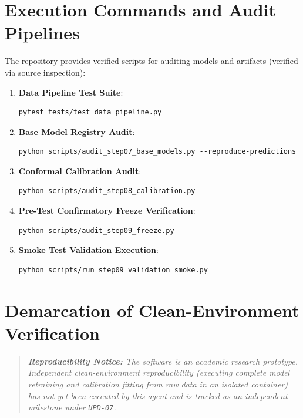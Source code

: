 \section{Execution Commands and Audit Pipelines}
The repository provides verified scripts for auditing models and artifacts (verified via source inspection):
\begin{enumerate}
    \item \textbf{Data Pipeline Test Suite}:
\begin{verbatim}
pytest tests/test_data_pipeline.py
\end{verbatim}
    \item \textbf{Base Model Registry Audit}:
\begin{verbatim}
python scripts/audit_step07_base_models.py --reproduce-predictions
\end{verbatim}
    \item \textbf{Conformal Calibration Audit}:
\begin{verbatim}
python scripts/audit_step08_calibration.py
\end{verbatim}
    \item \textbf{Pre-Test Confirmatory Freeze Verification}:
\begin{verbatim}
python scripts/audit_step09_freeze.py
\end{verbatim}
    \item \textbf{Smoke Test Validation Execution}:
\begin{verbatim}
python scripts/run_step09_validation_smoke.py
\end{verbatim}
\end{enumerate}

\section{Demarcation of Clean-Environment Verification}
\begin{quote}
\itshape
\textbf{Reproducibility Notice:} The software is an academic research prototype. Independent clean-environment reproducibility (executing complete model retraining and calibration fitting from raw data in an isolated container) has not yet been executed by this agent and is tracked as an independent milestone under \texttt{UPD-07}.
\end{quote}
